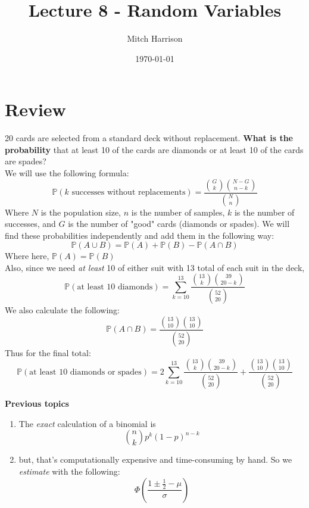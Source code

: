 \documentclass[titlepage, 12pt, leqno]{article}
\title{\Huge{Lecture 8 - Random Variables}}
\author{\large{Mitch Harrison}}
\date{\today}
\begin{document}
\setlength{\parskip}{1\baselineskip}
\setlength{\parindent}{15pt}
\maketitle
\tableofcontents
\newpage


\section{Review}
\begin{ex}
    20 cards are selected from a standard deck without replacement. 
    \textbf{What is the probability} that at least 10 of the cards are diamonds
    or at least 10 of the cards are spades?\\[.1in]
    We will use the following formula:
    \[
    \mathbb{P}(k \text{ successes without replacements}) = \frac{\binom{G}{k}\binom{N-G}{n-k}}{\binom{N}{n}} 
    \]
    Where $N$ is the population size, $n$ is the number of samples, $k$ is 
    the number of successes, and $G$ is the number of "good" cards (diamonds or
    spades). We will find these probabilities independently and add them in the 
    following way:
    \[
    \mathbb{P}(A \cup B) = \mathbb{P}(A) + \mathbb{P}(B) - \mathbb{P}(A \cap B)
    \]
    Where here, $\mathbb{P}(A) = \mathbb{P}(B)$ \\[.1in]
    Also, since we need \textit{at least} 10 of either suit with 13 total of each
    suit in the deck,
    \[
    \mathbb{P}( \text{at least 10 diamonds}) = \sum_{k=10}^{13}\frac{\binom{13}{k}\binom{39}{20-k}}{\binom{52}{20}} 
    \]
    We also calculate the following:
    \[
    \mathbb{P}(A \cap B) = \frac{\binom{13}{10}\binom{13}{10}}{\binom{52}{20}} 
    \]
    Thus for the final total:
    \[
       \mathbb{P}( \text{at least 10 diamonds or spades}) = \boxed{2\sum_{k=10}^{13}\frac{\binom{13}{k}\binom{39}{20-k}}{\binom{52}{20}} + \frac{\binom{13}{10}\binom{13}{10}}{\binom{52}{20}}}
    \]
\end{ex}

\textbf{Previous topics} 
\begin{enumerate}
    \item The \textit{exact} calculation of a binomial is 
        \[
            \binom{n}{k}p^k(1-p)^{n-k}
        \]
    \item but, that's computationally expensive and time-consuming by hand. So we
        \textit{estimate} with the following:
        \[
            \Phi\left(\frac{1 \pm \frac{1}{2} - \mu}{\sigma} \right)
        \]
\end{enumerate}
\end{document}
